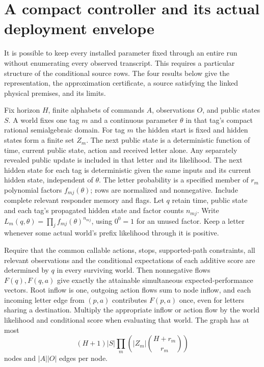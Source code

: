 \section{A compact controller and its actual deployment envelope}\label{app:unified}
It is possible to keep every installed parameter fixed through an entire run without enumerating every observed transcript. This requires a particular structure of the conditional source rows. The four results below give the representation, the approximation certificate, a source satisfying the linked physical premises, and its limits.

\begin{theorem}\label{adv:ug1}
Fix horizon \(H\), finite alphabets of commands \(A\), observations \(O\), and public states \(S\). A world fixes one tag \(m\) and a continuous parameter \(\theta\) in that tag's compact rational semialgebraic domain. For tag \(m\) the hidden start is fixed and hidden states form a finite set \(Z_m\). The next public state is a deterministic function of time, current public state, action and received letter alone. Any separately revealed public update is included in that letter and its likelihood. The next hidden state for each tag is deterministic given the same inputs and its current hidden state, independent of \(\theta\). The letter probability is a specified member of \(r_m\) polynomial factors \(f_{mj}(\theta)\); rows are normalized and nonnegative. Include complete relevant responder memory and flags. Let \(q\) retain time, public state and each tag's propagated hidden state and factor counts \(n_{mj}\). Write \(L_m(q,\theta)=\prod_j f_{mj}(\theta)^{n_{mj}}\), using \(0^0=1\) for an unused factor. Keep a letter whenever some actual world's prefix likelihood through it is positive.

Require that the common callable actions, stops, supported-path constraints, all relevant observations and the conditional expectations of each additive score are determined by \(q\) in every surviving world. Then nonnegative flows \(F(q),F(q,a)\) give exactly the attainable simultaneous expected-performance vectors. Root inflow is one, outgoing action flows sum to node inflow, and each incoming letter edge from \((p,a)\) contributes \(F(p,a)\) once, even for letters sharing a destination. Multiply the appropriate inflow or action flow by the world likelihood and conditional score when evaluating that world. The graph has at most
\[
 (H+1)|S|\prod_m\left(|Z_m|\binom{H+r_m}{r_m}\right)
\]
nodes and \(|A||O|\) edges per node.
\end{theorem}
